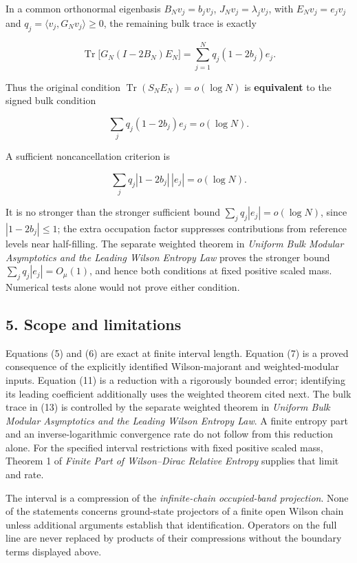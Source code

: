 \documentclass[
  10pt,
  a4paper,
]{article}
\begin{document}
In a common orthonormal eigenbasis \(B_Nv_j=b_jv_j\), \(J_Nv_j=\lambda_jv_j\), with \(E_Nv_j=e_jv_j\) and \(q_j=\langle v_j,G_Nv_j\rangle\ge0\), the remaining bulk trace is exactly

\[
\boxed{
\operatorname{Tr}\bigl[G_N(I-2B_N)E_N\bigr]
=\sum_{j=1}^{N}q_j(1-2b_j)e_j.}
\tag{12}
\]

Thus the original condition \(\operatorname{Tr}(S_NE_N)=o(\log N)\) is \textbf{equivalent} to the signed bulk condition

\[
\sum_jq_j(1-2b_j)e_j=o(\log N).
\tag{13}
\]

A sufficient noncancellation criterion is

\[
\boxed{\sum_jq_j|1-2b_j|\,|e_j|=o(\log N).}
\tag{14}
\]

It is no stronger than the stronger sufficient bound \(\sum_jq_j|e_j|=o(\log N)\), since \(|1-2b_j|\le1\); the extra occupation factor suppresses contributions from reference levels near half-filling. The separate weighted theorem in \emph{Uniform Bulk Modular Asymptotics and the Leading Wilson Entropy Law} proves the stronger bound \(\sum_jq_j|e_j|=O_\mu(1)\), and hence both conditions at fixed positive scaled mass. Numerical tests alone would not prove either condition.

\subsection{5. Scope and limitations}\label{scope-and-limitations}

Equations (5) and (6) are exact at finite interval length. Equation (7) is a proved consequence of the explicitly identified Wilson-majorant and weighted-modular inputs. Equation (11) is a reduction with a rigorously bounded error; identifying its leading coefficient additionally uses the weighted theorem cited next. The bulk trace in (13) is controlled by the separate weighted theorem in \emph{Uniform Bulk Modular Asymptotics and the Leading Wilson Entropy Law}. A finite entropy part and an inverse-logarithmic convergence rate do not follow from this reduction alone. For the specified interval restrictions with fixed positive scaled mass, Theorem 1 of \emph{Finite Part of Wilson--Dirac Relative Entropy} supplies that limit and rate.

The interval is a compression of the \emph{infinite-chain occupied-band projection}. None of the statements concerns ground-state projectors of a finite open Wilson chain unless additional arguments establish that identification. Operators on the full line are never replaced by products of their compressions without the boundary terms displayed above.
\end{document}
